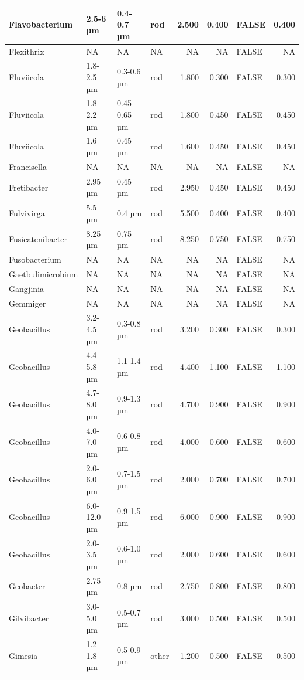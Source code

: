 \documentclass[
]{article}
\begin{document}
\begin{table}
\begin{tabular}{l|l|l|l|r|r|l|r}
Flavobacterium & 2.5-6 µm & 0.4-0.7 µm & rod & 2.500 & 0.400 & FALSE & 0.400\\
\hline
Flexithrix & NA & NA & NA & NA & NA & FALSE & NA\\
\hline
Fluviicola & 1.8-2.5 µm & 0.3-0.6 µm & rod & 1.800 & 0.300 & FALSE & 0.300\\
\hline
Fluviicola & 1.8-2.2 µm & 0.45-0.65 µm & rod & 1.800 & 0.450 & FALSE & 0.450\\
\hline
Fluviicola & 1.6 µm & 0.45 µm & rod & 1.600 & 0.450 & FALSE & 0.450\\
\hline
Francisella & NA & NA & NA & NA & NA & FALSE & NA\\
\hline
Fretibacter & 2.95 µm & 0.45 µm & rod & 2.950 & 0.450 & FALSE & 0.450\\
\hline
Fulvivirga & 5.5 µm & 0.4 µm & rod & 5.500 & 0.400 & FALSE & 0.400\\
\hline
Fusicatenibacter & 8.25 µm & 0.75 µm & rod & 8.250 & 0.750 & FALSE & 0.750\\
\hline
Fusobacterium & NA & NA & NA & NA & NA & FALSE & NA\\
\hline
Gaetbulimicrobium & NA & NA & NA & NA & NA & FALSE & NA\\
\hline
Gangjinia & NA & NA & NA & NA & NA & FALSE & NA\\
\hline
Gemmiger & NA & NA & NA & NA & NA & FALSE & NA\\
\hline
Geobacillus & 3.2-4.5 µm & 0.3-0.8 µm & rod & 3.200 & 0.300 & FALSE & 0.300\\
\hline
Geobacillus & 4.4-5.8 µm & 1.1-1.4 µm & rod & 4.400 & 1.100 & FALSE & 1.100\\
\hline
Geobacillus & 4.7-8.0 µm & 0.9-1.3 µm & rod & 4.700 & 0.900 & FALSE & 0.900\\
\hline
Geobacillus & 4.0-7.0 µm & 0.6-0.8 µm & rod & 4.000 & 0.600 & FALSE & 0.600\\
\hline
Geobacillus & 2.0-6.0 µm & 0.7-1.5 µm & rod & 2.000 & 0.700 & FALSE & 0.700\\
\hline
Geobacillus & 6.0-12.0 µm & 0.9-1.5 µm & rod & 6.000 & 0.900 & FALSE & 0.900\\
\hline
Geobacillus & 2.0-3.5 µm & 0.6-1.0 µm & rod & 2.000 & 0.600 & FALSE & 0.600\\
\hline
Geobacter & 2.75 µm & 0.8 µm & rod & 2.750 & 0.800 & FALSE & 0.800\\
\hline
Gilvibacter & 3.0-5.0 µm & 0.5-0.7 µm & rod & 3.000 & 0.500 & FALSE & 0.500\\
\hline
Gimesia & 1.2-1.8 µm & 0.5-0.9 µm & other & 1.200 & 0.500 & FALSE & 0.500\\

\end{tabular}
\end{table}
\end{document}

